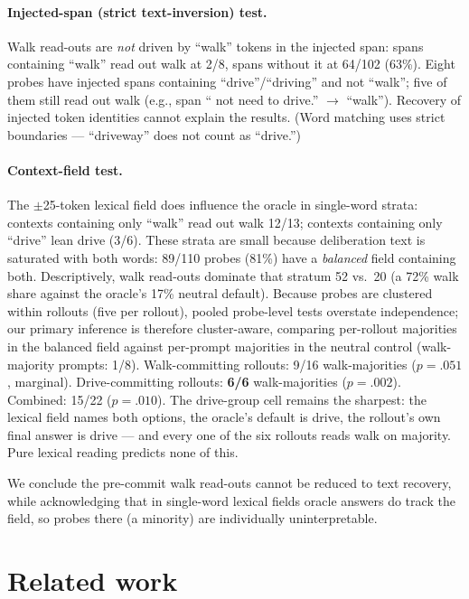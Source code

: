 \documentclass[11pt]{article}
\begin{document}
\paragraph{Injected-span (strict text-inversion) test.} Walk read-outs are
\emph{not} driven by ``walk'' tokens in the injected span: spans
containing ``walk'' read out walk at 2/8, spans without it at 64/102
(63\%). Eight probes have injected spans containing ``drive''/``driving''
and not ``walk''; five of them still read out walk (e.g., span `` not need
to drive.'' $\rightarrow$ ``walk''). Recovery of injected token identities
cannot explain the results. (Word matching uses strict boundaries ---
``driveway'' does not count as ``drive.'')

\paragraph{Context-field test.} The $\pm$25-token lexical field does
influence the oracle in single-word strata: contexts containing only
``walk'' read out walk 12/13; contexts containing only ``drive'' lean
drive (3/6). These strata are small because deliberation text is saturated
with both words: 89/110 probes (81\%) have a \emph{balanced} field
containing both. Descriptively, walk read-outs dominate that stratum 52
vs.\ 20 (a 72\% walk share against the oracle's 17\% neutral default).
Because probes are clustered within rollouts (five per rollout), pooled
probe-level tests overstate independence; our primary inference is
therefore cluster-aware, comparing per-rollout majorities in the balanced
field against per-prompt majorities in the neutral control (walk-majority
prompts: 1/8). Walk-committing rollouts: 9/16 walk-majorities ($p = .051$,
marginal). Drive-committing rollouts: \textbf{6/6} walk-majorities
($p = .002$). Combined: 15/22 ($p = .010$). The drive-group cell remains
the sharpest: the lexical field names both options, the oracle's default
is drive, the rollout's own final answer is drive --- and every one of the
six rollouts reads walk on majority. Pure lexical reading predicts none of
this.

We conclude the pre-commit walk read-outs cannot be reduced to text
recovery, while acknowledging that in single-word lexical fields oracle
answers do track the field, so probes there (a minority) are individually
uninterpretable.

\section{Related work}
\end{document}
